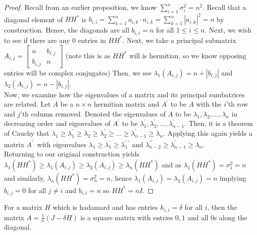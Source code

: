 \begin{proof}
	Recall from an earlier proposition, we know \(\sum_{i= 1}^{n} \sigma_{i}^2 = n^2\). Recall that a diagonal element of \(HH^{*}\) is \(b_{i, i} = \sum_{k= 1}^{n} a_{i, k} \cdot \overline{a_{i, k}} = \sum_{k= 1}^{n} \left| a_{i, k} \right| ^2 = n\) by construction. Hence, the diagonals are all \(b_{i, i} = n\) for all \(1\le i \le n\). Next, we wish to see if there are any \(0\) entries in \(H H^{*}\). Next, we take  a principal submatrix \(A_{i, j} = \begin{bmatrix} n&\overline{b_{i, j}}\\
	b_{i, j}&n\end{bmatrix} \) (note this is as \(HH^{*}\) will is hermitian, so we know opposing entries will be complex conjugates) Then, we see \(\lambda_{1}\left( A_{i, j} \right) = n + \left| b_{i, j} \right| \) and \(\lambda_2 \left( A_{i, j} \right) = n - \left| b_{i, j} \right| \).\\
	Now, we examine how the eigenvalues of a matrix and its principal sumbatrices are related. Let \(A\) be a \(n \times n\) hermitian matrix and \(A^{\prime}\) to be \(A\) with the \(i\)'th row and \(j\)'th column removed. Denoted the eigenvalues of \(A\) to be \(\lambda_1, \lambda_2, \ldots, \lambda_{n}\) in decreasing order and eigenvalues of \(A^{\prime}\) to be \(\lambda_1^{\prime} ,  \lambda_2^{\prime}, \ldots, \lambda_{n-1}^{\prime}\). Then, it is a theorem of Cauchy that \(\lambda_1 \ge \lambda_1^{\prime} \ge \lambda_2 \ge \lambda_2^{\prime} \ge \ldots \ge \lambda_{n-1}^{\prime} \ge \lambda_{n}\). Applying this again yields a matrix \(A^{\prime}^{\prime}\) with eigenvalues \(\lambda_1 \ge \lambda_1^{\prime} \ge \lambda_1^{\prime}^{\prime}\) and \(\lambda_{n-2}^{\prime\prime} \ge \lambda_{n-1}^{\prime} \ge \lambda_{n}\).\\
	Returning to our original construction yields \(\lambda_1 \left( HH^{*} \right)  \ge \lambda_1 \left( A_{i, j} \right)  \ge \lambda_2 \left( A_{i, j} \right) \ge \lambda_{n} \left( HH^{*} \right) \) and as \(\lambda_1 \left( HH^{*} \right)  = \sigma_1^2 = n\) and similarly, \(\lambda_{n} \left( HH^{*} \right) = \sigma_{n}^2 = n\), hence \(\lambda_1 \left( A_{i, j} \right)  = \lambda_2 \left( A_{i, j} \right)  = n\) implying \(b_{i, j} = 0\) for all \(j \neq i\) and \(b_{i, i} = n\) so \(HH^{*} = nI\).
\end{proof}
\begin{recall}
	For a matrix \(H\) which is hadamard and has entries \(h_{i, i} = \delta\) for all \(i\), then the matrix \(A = \frac{1}{n}\left( J - \delta H \right) \) is a square matrix with entries \(0, 1\) and all \(0\)s along the diagonal.
\end{recall}
